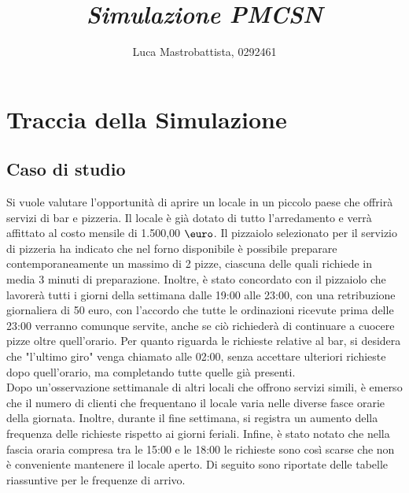 \documentclass[a4paper, 12pt]{article}
\begin{document}
\title{
    \textbf{    
        \emph{Simulazione PMCSN}
    }
}
\author{Luca Mastrobattista, 0292461}
\date{} %
\maketitle  



\tableofcontents

\newpage
\section{Traccia della Simulazione}
\subsection{Caso di studio}
Si vuole valutare l'opportunità di aprire un locale in un piccolo paese che offrirà servizi di bar e pizzeria. Il locale è già dotato di tutto l'arredamento e verrà affittato al costo mensile di 1.500,00 $\mbox{\euro}$. Il pizzaiolo selezionato per il servizio di pizzeria ha indicato che nel forno disponibile è possibile preparare contemporaneamente un massimo di 2 pizze, ciascuna delle quali richiede in media 3 minuti di preparazione. Inoltre, è stato concordato con il pizzaiolo che lavorerà tutti i giorni della settimana dalle 19:00 alle 23:00, con una retribuzione giornaliera di 50 euro, con l'accordo che tutte le ordinazioni ricevute prima delle 23:00 verranno comunque servite, anche se ciò richiederà di continuare a cuocere pizze oltre quell'orario. Per quanto riguarda le richieste relative al bar, si desidera che "l'ultimo giro" venga chiamato alle 02:00, senza accettare ulteriori richieste dopo quell'orario, ma completando tutte quelle già presenti.\\

Dopo un'osservazione settimanale di altri locali che offrono servizi simili, è emerso che il numero di clienti che frequentano il locale varia nelle diverse fasce orarie della giornata. Inoltre, durante il fine settimana, si registra un aumento della frequenza delle richieste rispetto ai giorni feriali. Infine, è stato notato che nella fascia oraria compresa tra le 15:00 e le 18:00 le richieste sono così scarse che non è conveniente mantenere il locale aperto. Di seguito sono riportate delle tabelle riassuntive per le frequenze di arrivo.
\end{document}
